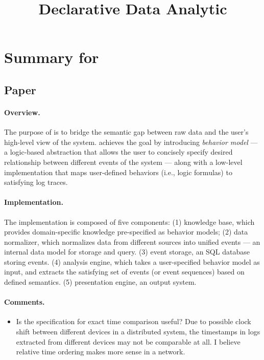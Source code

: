 \documentclass{article}
\begin{document}


\title{Declarative Data Analytic}
\author{}

\maketitle

\section{Summary for \saf}
\label{sec:saf}

\subsection{Paper}
\label{sec:safpaper}

\paragraph{Overview.}
The purpose of \saf\cite{arun2011} is to bridge the semantic gap between raw
data and the user's high-level view of the system. \saf achieves the goal by
introducing {\em behavior model} --- a logic-based abstraction that allows the user to
concisely specify desired relationship between different events of the system --- along
with a low-level implementation that maps user-defined behaviors (i.e., logic
formulas) to satisfying log traces. 

\paragraph{Implementation.}
The implementation is composed of five components: 
(1) knowledge base, which provides domain-specific knowledge pre-specified as behavior
models; 
(2) data normalizer, which normalizes data from different sources into unified
events --- an internal data model for storage and query.
(3) event storage, an SQL database storing events.
(4) analysis engine, which takes a user-specified behavior model as input, and
extracts the satisfying set of events (or event sequences) based on defined
semantics.
(5) presentation engine, an output system.

\paragraph{Comments.}
\begin{itemize}
\item Is the specification for exact time comparison useful? Due to possible
  clock shift between different devices in a distributed system, the timestamps
  in logs extracted from different devices may not be comparable at all. I
  believe relative time ordering makes more sense in a network.
\end{itemize}
\end{document}
